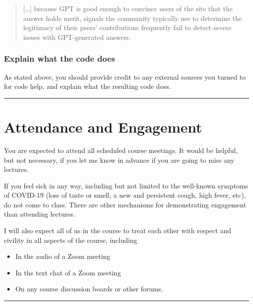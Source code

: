 \documentclass[
  letterpaper,
  DIV=11,
  numbers=noendperiod]{scrartcl}
\begin{document}
\begin{quote}
{[}\ldots{]} because GPT is good enough to convince users of the site
that the answer holds merit, signals the community typically use to
determine the legitimacy of their peers' contributions frequently fail
to detect severe issues with GPT-generated answers.
\end{quote}

\hypertarget{explain-what-the-code-does}{%
\subsubsection{Explain what the code
does}\label{explain-what-the-code-does}}

As stated above, you should provide credit to any external sources you
turned to for code help, and explain what the resulting code does.

\begin{center}\rule{0.5\linewidth}{0.5pt}\end{center}

\hypertarget{attendance-and-engagement}{%
\section{Attendance and Engagement}\label{attendance-and-engagement}}

You are expected to attend all scheduled course meetings. It would be
helpful, but not necessary, if you let me know in advance if you are
going to miss any lectures.

If you feel sick in any way, including but not limited to the well-known
symptoms of COVID-19 (loss of taste or smell, a new and persistent
cough, high fever, etc), do not come to class. There are other
mechanisms for demonstrating engagement than attending lectures.

I will also expect all of us in the course to treat each other with
respect and civility in all aspects of the course, including

\begin{itemize}
\item
  In the audio of a Zoom meeting
\item
  In the text chat of a Zoom meeting
\item
  On any course discussion boards or other forums.
\end{itemize}

\begin{center}\rule{0.5\linewidth}{0.5pt}\end{center}
\end{document}
